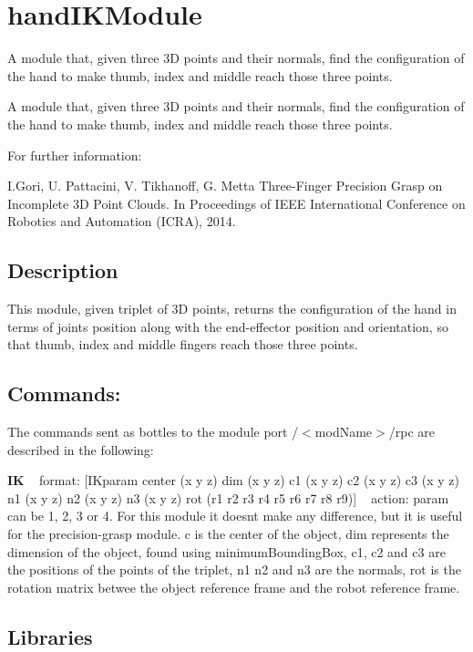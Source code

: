 \section{hand\+I\+K\+Module}
\label{group__handIKModule}


A module that, given three 3D points and their normals, find the configuration of the hand to make thumb, index and middle reach those three points.  


A module that, given three 3D points and their normals, find the configuration of the hand to make thumb, index and middle reach those three points. 

For further information\+:

I.\+Gori, U. Pattacini, V. Tikhanoff, G. Metta Three-\/\+Finger Precision Grasp on Incomplete 3D Point Clouds. In Proceedings of I\+E\+EE International Conference on Robotics and Automation (I\+C\+RA), 2014.\hypertarget{group__handIKModule_intro_sec}{}\subsection{Description}\label{group__handIKModule_intro_sec}
This module, given triplet of 3D points, returns the configuration of the hand in terms of joints position along with the end-\/effector position and orientation, so that thumb, index and middle fingers reach those three points.\hypertarget{group__handIKModule_rpc_port}{}\subsection{Commands\+:}\label{group__handIKModule_rpc_port}
The commands sent as bottles to the module port /$<$mod\+Name$>$/rpc are described in the following\+:

{\bfseries IK} ~\newline
format\+: \mbox{[}I\+Kparam center (x y z) dim (x y z) c1 (x y z) c2 (x y z) c3 (x y z) n1 (x y z) n2 (x y z) n3 (x y z) rot (r1 r2 r3 r4 r5 r6 r7 r8 r9)\mbox{]} ~\newline
action\+: param can be 1, 2, 3 or 4. For this module it doesn\textquotesingle{}t make any difference, but it is useful for the precision-\/grasp module. c is the center of the object, dim represents the dimension of the object, found using minimum\+Bounding\+Box, c1, c2 and c3 are the positions of the points of the triplet, n1 n2 and n3 are the normals, rot is the rotation matrix betwee the object reference frame and the robot reference frame.\hypertarget{group__handIKModule_lib_sec}{}\subsection{Libraries}\label{group__handIKModule_lib_sec}


